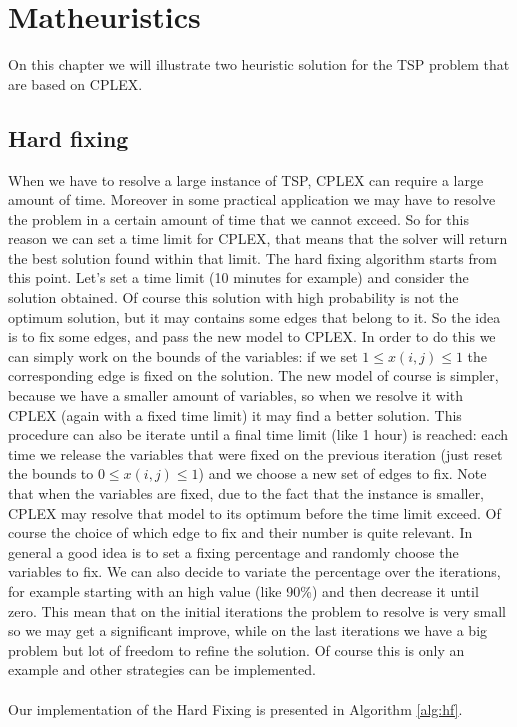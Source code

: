 \chapter{Matheuristics}
On this chapter we will illustrate two heuristic solution for the TSP problem that are based on CPLEX.

\section{Hard fixing}
When we have to resolve a large instance of TSP, CPLEX can require a large amount of time. Moreover in some practical application we may have to resolve the problem in a certain amount of time that we cannot exceed. So for this reason we can set a time limit for CPLEX, that means that the solver will return the best solution found within that limit. The hard fixing algorithm starts from this point. Let's set a time limit (10 minutes for example) and consider the solution obtained. Of course this solution with high probability is not the optimum solution, but it may contains some edges that belong to it. So the idea is to fix some edges, and pass the new model to CPLEX. In order to do this we can simply work on the bounds of the variables: if we set $1 \leq x(i,j) \leq 1$ the corresponding edge is fixed on the solution. The new model of course is simpler, because we have a smaller amount of variables, so when we resolve it with CPLEX (again with a fixed time limit) it may find a better solution. This procedure can also be iterate until a final time limit (like 1 hour) is reached: each time we release the variables that were fixed on the previous iteration (just reset the bounds to $0 \leq x(i,j) \leq 1$) and we choose a new set of edges to fix.
Note that when the variables are fixed, due to the fact that the instance is smaller, CPLEX may resolve that model to its optimum before the time limit exceed.
Of course the choice of which edge to fix and their number is quite relevant. In general a good idea is to set a fixing percentage and randomly choose the variables to fix. We can also decide to variate the percentage over the iterations, for example starting with an high value (like 90\%) and then decrease it until zero. This mean that on the initial iterations the problem to resolve is very small so we may get a significant improve, while on the last iterations we have a big problem but lot of freedom to refine the solution. Of course this is only an example and other strategies can be implemented.  
\\\\ Our implementation of the Hard Fixing is presented in Algorithm \ref{alg:hf}. 
